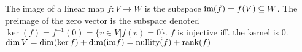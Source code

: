  The image of a linear map $f : V \to W$ is the subspace $\text{im}(f) = f(V) \subseteq W$. The preimage of the zero vector is the subspace denoted $\ker(f) = f^{-1}(0) = \{v \in V | f(v)=0\}$.
 $f$ is injective iff. the kernel is 0. %
 $\dim V = \dim(\ker f) + \dim(\text{im} f) = \text{nullity}(f) + \text{rank}(f)$
